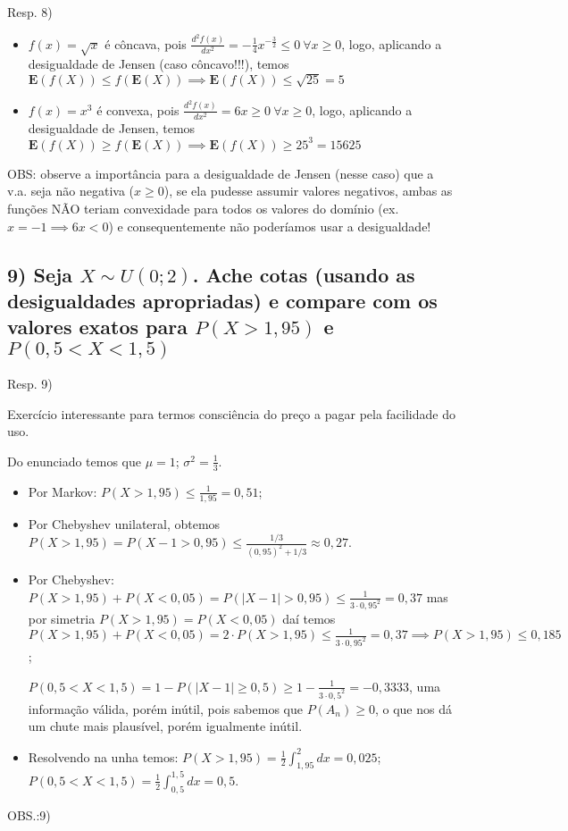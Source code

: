 \documentclass[portuguese]{article}
\begin{document}
Resp. 8)
\begin{itemize}
\item $f(x)=\sqrt{x}$ é côncava, pois $\frac{d^{2}f(x)}{dx^{2}}=-\frac{1}{4}x^{-\frac{3}{2}}\le0\ \forall x\ge0$,
logo, aplicando a desigualdade de Jensen (caso côncavo!!!), temos
$\mathbf{E}(f(X))\le f(\mathbf{E}(X))\implies\mathbf{E}(f(X))\le\sqrt{25}=5$
\item $f(x)=x^{3}$ é convexa, pois $\frac{d^{2}f(x)}{dx^{2}}=6x\ge0\ \forall x\ge0$,
logo, aplicando a desigualdade de Jensen, temos $\mathbf{E}(f(X))\ge f(\mathbf{E}(X))\implies\mathbf{E}(f(X))\ge25^{3}=15625$
\end{itemize}
OBS: observe a importância para a desigualdade de Jensen (nesse caso)
que a v.a. seja não negativa ($x\ge0$), se ela pudesse assumir valores
negativos, ambas as funções NÃO teriam convexidade para todos os valores
do domínio (ex. $x=-1\implies6x<0$) e consequentemente não poderíamos
usar a desigualdade!


\subsubsection*{\textcompwordmark{}}


\subsection*{\textmd{9) Seja $X\sim U(0;2)$. Ache cotas (usando as desigualdades
apropriadas) e compare com os valores exatos para $P(X>1,95)$ e $P(0,5<X<1,5)$}}

Resp. 9)

Exercício interessante para termos consciência do preço a pagar pela
facilidade do uso.

Do enunciado temos que $\mu=1$; $\sigma^{2}=\frac{1}{3}$.

\begin{itemize}
\item Por Markov: $P(X>1,95)\leq \frac{1}{1,95}=0,51$;  
\item Por Chebyshev unilateral, obtemos $P(X>1,95)=P(X-1>0,95)\leq \frac{1/3}{(0,95)^2+1/3}\approx 0,27.$
\item Por Chebyshev: $P(X>1,95)+P(X<0,05)=P(\left|X-1\right|>0,95)\leq\frac{1}{3\cdot0,95^{2}}=0,37$
mas por simetria $P(X>1,95)=P(X<0,05)$ daí temos $P(X>1,95)+P(X<0,05)=2\cdot P(X>1,95)\leq\frac{1}{3\cdot0,95^{2}}=0,37\implies P(X>1,95)\leq 0,185$;\\
\medskip

\noindent
$P(0,5<X<1,5)=1-P(\left|X-1\right|\geq0,5)\geq 1-\frac{1}{3\cdot0,5^{2}}=-0,3333$,
uma informação válida, porém inútil, pois sabemos que $P(A_{n})\ge0$,
o que nos dá um chute mais plausível, porém igualmente inútil.
\item Resolvendo na unha temos: $P(X>1,95)=\frac{1}{2}\int_{1,95}^{2}dx=0,025$;
$P(0,5<X<1,5)=\frac{1}{2}\int_{0,5}^{1,5}dx=0,5.$
\end{itemize}
OBS.:9)
\end{document}
